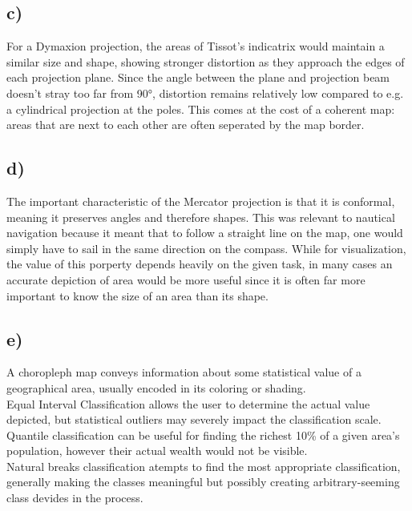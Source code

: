 \documentclass[a4paper]{article}
\begin{document}
\subsection*{c)} For a Dymaxion projection, the areas of Tissot’s indicatrix would maintain a similar size and shape, showing stronger distortion as they approach the edges of each projection plane. Since the angle between the plane and projection beam doesn't stray too far from 90°, distortion remains relatively low compared to e.g. a cylindrical projection at the poles. This comes at the cost of a coherent map: areas that are next to each other are often seperated by the map border.
\subsection*{d)} The important characteristic of the Mercator projection is that it is conformal, meaning it preserves angles and therefore shapes. This was relevant to nautical navigation because it meant that to follow a straight line on the map, one would simply have to sail in the same direction on the compass. While for visualization, the value of this porperty depends heavily on the given task, in many cases an accurate depiction of area would be more useful since it is often far more important to know the size of an area than its shape.
\subsection*{e)} A choropleph map conveys information about some statistical value of a geographical area, usually encoded in its coloring or shading.\\ Equal Interval Classification allows the user to determine the actual value depicted, but statistical outliers may severely impact the classification scale.\\
Quantile classification can be useful for finding the richest 10\% of a given area's population, however their actual wealth would not be visible.\\
Natural breaks classification atempts to find the most appropriate classification, generally making the classes meaningful but possibly creating arbitrary-seeming class devides in the process.
\end{document}

